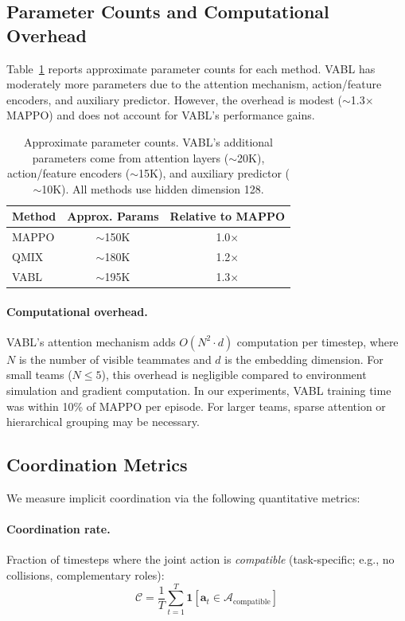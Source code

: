 \documentclass{article}
\theoremstyle{plain}
\theoremstyle{definition}
\theoremstyle{remark}
\begin{document}
\subsection{Parameter Counts and Computational Overhead}
\label{app:params}

Table~\ref{tab:param_counts} reports approximate parameter counts for each method. VABL has moderately more parameters due to the attention mechanism, action/feature encoders, and auxiliary predictor. However, the overhead is modest ($\sim$1.3$\times$ MAPPO) and does not account for VABL's performance gains.

\begin{table}[h]
\centering
\begin{tabular}{lcc}
\toprule
\textbf{Method} & \textbf{Approx. Params} & \textbf{Relative to MAPPO} \\
\midrule
MAPPO & $\sim$150K & 1.0$\times$ \\
QMIX & $\sim$180K & 1.2$\times$ \\
VABL & $\sim$195K & 1.3$\times$ \\
\bottomrule
\end{tabular}
\caption{Approximate parameter counts. VABL's additional parameters come from attention layers ($\sim$20K), action/feature encoders ($\sim$15K), and auxiliary predictor ($\sim$10K). All methods use hidden dimension 128.}
\label{tab:param_counts}
\end{table}

\paragraph{Computational overhead.}
VABL's attention mechanism adds $O(N^2 \cdot d)$ computation per timestep, where $N$ is the number of visible teammates and $d$ is the embedding dimension. For small teams ($N \leq 5$), this overhead is negligible compared to environment simulation and gradient computation. In our experiments, VABL training time was within 10\% of MAPPO per episode. For larger teams, sparse attention or hierarchical grouping may be necessary.


\subsection{Coordination Metrics}
\label{app:metrics}

We measure implicit coordination via the following quantitative metrics:

\paragraph{Coordination rate.} Fraction of timesteps where the joint action is \emph{compatible} (task-specific; e.g., no collisions, complementary roles):
\begin{equation}
\mathcal{C} = \frac{1}{T}\sum_{t=1}^T \mathbf{1}[\mathbf{a}_t \in \mathcal{A}_{\mathrm{compatible}}]
\end{equation}
\end{document}
